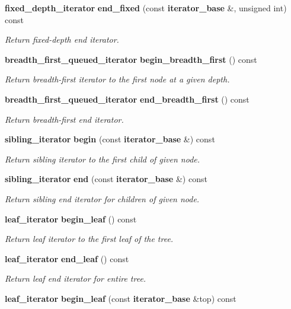 \begin{DoxyCompactItemize}
{\bf fixed\+\_\+depth\+\_\+iterator} {\bf end\+\_\+fixed} (const {\bf iterator\+\_\+base} \&, unsigned int) const 
\begin{DoxyCompactList}\small\item\em Return fixed-\/depth end iterator. \end{DoxyCompactList}\item 
{\bf breadth\+\_\+first\+\_\+queued\+\_\+iterator} {\bf begin\+\_\+breadth\+\_\+first} () const 
\begin{DoxyCompactList}\small\item\em Return breadth-\/first iterator to the first node at a given depth. \end{DoxyCompactList}\item 
{\bf breadth\+\_\+first\+\_\+queued\+\_\+iterator} {\bf end\+\_\+breadth\+\_\+first} () const 
\begin{DoxyCompactList}\small\item\em Return breadth-\/first end iterator. \end{DoxyCompactList}\item 
{\bf sibling\+\_\+iterator} {\bf begin} (const {\bf iterator\+\_\+base} \&) const 
\begin{DoxyCompactList}\small\item\em Return sibling iterator to the first child of given node. \end{DoxyCompactList}\item 
{\bf sibling\+\_\+iterator} {\bf end} (const {\bf iterator\+\_\+base} \&) const 
\begin{DoxyCompactList}\small\item\em Return sibling end iterator for children of given node. \end{DoxyCompactList}\item 
{\bf leaf\+\_\+iterator} {\bf begin\+\_\+leaf} () const 
\begin{DoxyCompactList}\small\item\em Return leaf iterator to the first leaf of the tree. \end{DoxyCompactList}\item 
{\bf leaf\+\_\+iterator} {\bf end\+\_\+leaf} () const 
\begin{DoxyCompactList}\small\item\em Return leaf end iterator for entire tree. \end{DoxyCompactList}\item 
{\bf leaf\+\_\+iterator} {\bf begin\+\_\+leaf} (const {\bf iterator\+\_\+base} \&top) const 

\end{DoxyCompactItemize}
